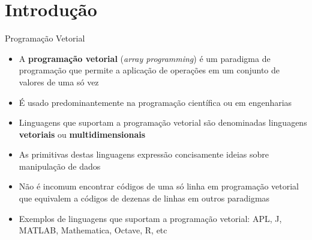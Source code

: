\section{Introdução}

\begin{frame}[fragile]{Programação Vetorial}

    \begin{itemize}
        \item A \textbf{programação vetorial} (\textit{array programming}) é um paradigma de 
            programação que permite a aplicação de operações em um conjunto de valores de uma só vez
        \pause

        \item É usado predominantemente na programação científica ou em engenharias
        \pause

        \item Linguagens que suportam a programação vetorial são denominadas linguagens 
            \textbf{vetoriais} ou \textbf{multidimensionais}
        \pause

        \item As primitivas destas linguagens expressão concisamente ideias sobre manipulação de 
            dados
        \pause
        \item Não é incomum encontrar códigos de uma só linha em programação vetorial que equivalem
            a códigos de dezenas de linhas em outros paradigmas
        \pause

        \item Exemplos de linguagens que suportam a programação vetorial: APL, J, MATLAB, 
            Mathematica, Octave, R, etc
    \end{itemize}

\end{frame}

